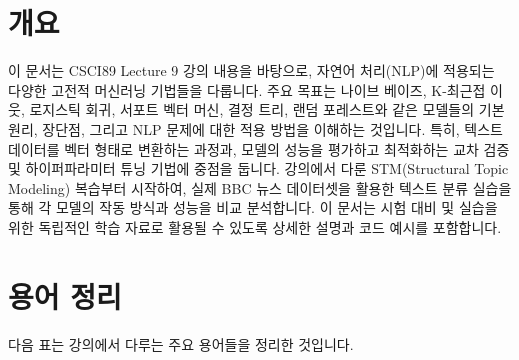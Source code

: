 \documentclass[11pt,a4paper]{article}
\begin{document}
\newpage
\section*{개요}

이 문서는 CSCI89 Lecture 9 강의 내용을 바탕으로, 자연어 처리(NLP)에 적용되는 다양한 고전적 머신러닝 기법들을 다룹니다.
주요 목표는 나이브 베이즈, K-최근접 이웃, 로지스틱 회귀, 서포트 벡터 머신, 결정 트리, 랜덤 포레스트와 같은 모델들의 기본 원리, 장단점, 그리고 NLP 문제에 대한 적용 방법을 이해하는 것입니다.
특히, 텍스트 데이터를 벡터 형태로 변환하는 과정과, 모델의 성능을 평가하고 최적화하는 교차 검증 및 하이퍼파라미터 튜닝 기법에 중점을 둡니다.
강의에서 다룬 STM(Structural Topic Modeling) 복습부터 시작하여, 실제 BBC 뉴스 데이터셋을 활용한 텍스트 분류 실습을 통해 각 모델의 작동 방식과 성능을 비교 분석합니다.
이 문서는 시험 대비 및 실습을 위한 독립적인 학습 자료로 활용될 수 있도록 상세한 설명과 코드 예시를 포함합니다.

\newpage
\section*{용어 정리}

다음 표는 강의에서 다루는 주요 용어들을 정리한 것입니다.
\end{document}
